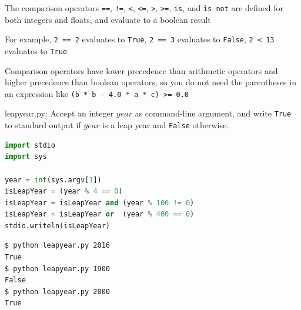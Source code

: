 \documentclass[8pt,a4paper,compress]{beamer}
\begin{document}
\begin{frame}[fragile]
\pause

The comparison operators \lstinline{==}, \lstinline{!=}, \lstinline{<}, \lstinline{<=}, \lstinline{>}, \lstinline{>=}, \lstinline{is}, and \lstinline{is not} are defined for both integers and floats, and evaluate to a boolean result

\pause
\bigskip

For example, \lstinline{2 == 2} evaluates to \lstinline{True}, \lstinline{2 == 3} evaluates to \lstinline{False}, \lstinline{2 < 13} evaluates to \lstinline{True} 

\pause
\bigskip

Comparison operators have lower precedence than arithmetic operators and higher precedence than boolean operators, so you do not need the parentheses in an expression like \lstinline{(b * b - 4.0 * a * c) >= 0.0}
\end{frame}

\begin{frame}[fragile]
\pause

\begin{framed}
\tiny leapyear.py: Accept an integer $year$ as command-line argument, and write \lstinline{True} to standard output if $year$ is a leap year and \lstinline{False} otherwise. 
\end{framed}

\begin{lstlisting}[language=Python]
import stdio
import sys

year = int(sys.argv[1])
isLeapYear = (year % 4 == 0)
isLeapYear = isLeapYear and (year % 100 != 0)
isLeapYear = isLeapYear or  (year % 400 == 0)
stdio.writeln(isLeapYear)
\end{lstlisting}

\pause

\begin{lstlisting}[language={}]
$ python leapyear.py 2016
True
$ python leapyear.py 1900
False
$ python leapyear.py 2000
True
\end{lstlisting}
\end{frame}
\end{document}
